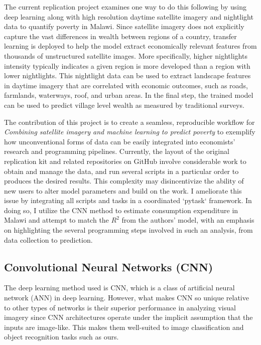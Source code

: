 \documentclass[11pt, a4paper, leqno]{article}
\begin{document}
The current replication project examines one way to do this following \citet{jean2016combining} by using deep learning along with high resolution daytime satellite imagery and nightlight data to quantify poverty in Malawi. Since satellite imagery does not explicitly capture the vast differences in wealth between regions of a country, transfer learning is deployed to help the model extract economically relevant features from thousands of unstructured satellite images. More specifically, higher nightlights intensity typically indicates a given region is more developed than a region with lower nightlights. This nightlight data can be used to extract landscape features in daytime imagery that are correlated with economic outcomes, such as roads, farmlands, waterways, roof, and urban areas. In the final step, the trained model can be used to predict village level wealth as measured by traditional surveys. 

The contribution of this project is to create a seamless, reproducible workflow for \textit{Combining satellite imagery and machine learning to predict poverty} \citep{jean2016combining} to exemplify how unconventional forms of data can be easily integrated into economists' research and programming pipelines. Currently, the layout of the original replication kit and related repositories on GitHub involve considerable work to obtain and manage the data, and run several scripts in a particular order to produces the desired results. This complexity may disincentivize the ability of new users to alter model parameters and build on the work. I ameliorate this issue by integrating all scripts and tasks in a coordinated `pytask` framework. In doing so, I utilize the CNN method to estimate consumption expenditure in Malawi and attempt to match the $R^2$ from the authors' model, with an emphasis on highlighting the several programming steps involved in such an analysis, from data collection to prediction. 

\subsection{Convolutional Neural Networks (CNN)}

The deep learning method used is CNN, which is a class of artificial neural network (ANN) in deep learning. However, what makes CNN so unique relative to other types of networks is their superior performance in analyzing visual imagery since CNN architectures operate under the implicit assumption that the inputs are image-like. This makes them well-suited to image classification and object recognition tasks such as ours.
\end{document}
